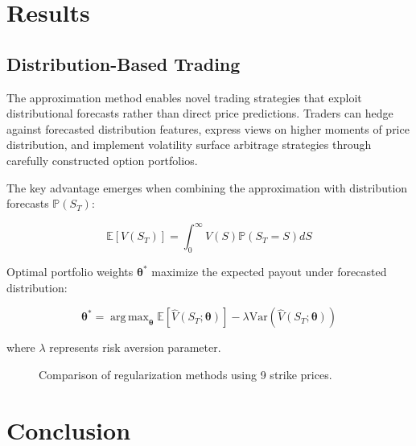 \documentclass[12pt]{article}
\DeclareMathOperator*{\argmax}{arg\,max}
\begin{document}
\section{Results}
\subsection{Distribution-Based Trading}
The approximation method enables novel trading strategies that exploit distributional forecasts rather than direct price predictions. Traders can hedge against forecasted distribution features, express views on higher moments of price distribution, and implement volatility surface arbitrage strategies through carefully constructed option portfolios.

The key advantage emerges when combining the approximation with distribution forecasts $\mathbb{P}(S_T)$:
 
\begin{equation}
\mathbb{E}[V(S_T)] = \int_{0}^{\infty} V(S) \mathbb{P}(S_T = S) dS
\end{equation}

Optimal portfolio weights $\boldsymbol{\theta}^*$ maximize the expected payout under forecasted distribution:

\begin{equation}
\boldsymbol{\theta}^* = \argmax_{\boldsymbol{\theta}} \mathbb{E}\left[\hat{V}(S_T;\boldsymbol{\theta})\right] - \lambda \text{Var}\left(\hat{V}(S_T;\boldsymbol{\theta})\right)
\end{equation}

where $\lambda$ represents risk aversion parameter.

\begin{figure}[htbp]
\centering

\caption{Comparison of regularization methods using 9 strike prices.}
\label{fig:regularization}
\end{figure}

\section{Conclusion}



\end{document}
